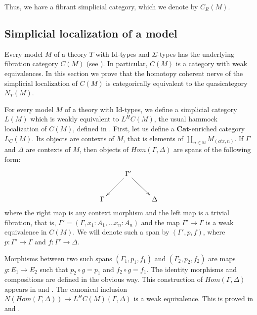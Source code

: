 \documentclass[reqno]{amsart}
\theoremstyle{definition}
\theoremstyle{remark}
\newcommand{\Id}{\mathrm{Id}}
\newcommand{\cat}[1]{\mathbf{#1}}
\newcommand{\Cat}{\cat{Cat}}
\numberwithin{figure}{section}
\begin{document}
Thus, we have a fibrant simplicial category, which we denote by $C_R(M)$.

\subsection{Simplicial localization of a model}

Every model $M$ of a theory $T$ with $\Id$-types and $\Sigma$-types has the underlying fibration category $C(M)$ (see \cite{tt-fibr-cat}).
In particular, $C(M)$ is a category with weak equivalences.
In this section we prove that the homotopy coherent nerve of the simplicial localization of $C(M)$ is categorically equivalent to the quasicategory $N_T(M)$.

For every model $M$ of a theory with $\Id$-types, we define a simplicial category $L(M)$ which is weakly equivalent to $L^H C(M)$,
the usual hammock localization of $C(M)$, defined in \cite{Dwyer1980}.
First, let us define a $\Cat$-enriched category $L_C(M)$.
Its objects are contexts of $M$, that is elements of $\coprod_{n \in \mathbb{N}} M_{(ctx,n)}$.
If $\Gamma$ and $\Delta$ are contexts of $M$, then objects of $Hom(\Gamma,\Delta)$ are spans of the following form:
\[ \xymatrix{        & \Gamma' \ar[ld] \ar[rd] & \\
              \Gamma &                         & \Delta
            } \]
where the right map is any context morphism and the left map is a trivial fibration, that is, $\Gamma' = (\Gamma, x_1 : A_1, \ldots x_n : A_n)$
and the map $\Gamma' \to \Gamma$ is a weak equivalence in $C(M)$.
We will denote such a span by $(\Gamma',p,f)$, where $p : \Gamma' \to \Gamma$ and $f : \Gamma' \to \Delta$.

Morphisms between two such spans $(\Gamma_1,p_1,f_1)$ and $(\Gamma_2,p_2,f_2)$ are maps $g : E_1 \to E_2$ such that $p_2 \circ g = p_1$ and $f_2 \circ g = f_1$.
The identity morphisms and compositions are defined in the obvious way.
This construction of $Hom(\Gamma,\Delta)$ appears in \cite{cis10b} and \cite{Nikolaus2015}.
The canonical inclusion $N(Hom(\Gamma,\Delta)) \to L^H C(M)(\Gamma,\Delta)$ is a weak equivalence.
This is proved in \cite[Proposition~3.23]{cis10b} and \cite[Theorem~3.61]{Nikolaus2015}.
\end{document}
